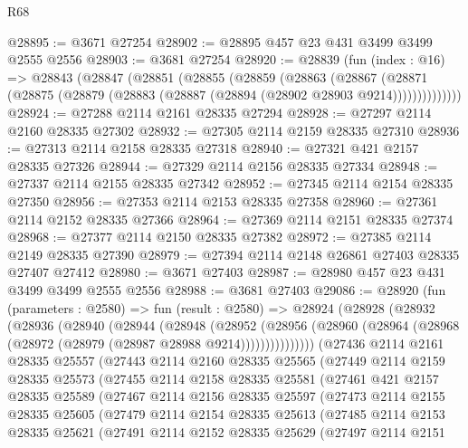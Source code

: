 \begin{lexlean}{R68}
\begin{coremodule}
@28895 := @3671 @27254
@28902 := @28895 @457 @23 @431 @3499 @3499 @2555 @2556
@28903 := @3681 @27254
@28920 := @28839
    (fun (index : @16) =>
    @28843
      (@28847
        (@28851
          (@28855
            (@28859
              (@28863
                (@28867
                  (@28871 (@28875 (@28879 (@28883 (@28887 (@28894 (@28902 @28903 @9214))))))))))))))
@28924 := @27288 @2114 @2161 @28335 @27294
@28928 := @27297 @2114 @2160 @28335 @27302
@28932 := @27305 @2114 @2159 @28335 @27310
@28936 := @27313 @2114 @2158 @28335 @27318
@28940 := @27321 @421 @2157 @28335 @27326
@28944 := @27329 @2114 @2156 @28335 @27334
@28948 := @27337 @2114 @2155 @28335 @27342
@28952 := @27345 @2114 @2154 @28335 @27350
@28956 := @27353 @2114 @2153 @28335 @27358
@28960 := @27361 @2114 @2152 @28335 @27366
@28964 := @27369 @2114 @2151 @28335 @27374
@28968 := @27377 @2114 @2150 @28335 @27382
@28972 := @27385 @2114 @2149 @28335 @27390
@28979 := @27394 @2114 @2148 @26861 @27403 @28335 @27407 @27412
@28980 := @3671 @27403
@28987 := @28980 @457 @23 @431 @3499 @3499 @2555 @2556
@28988 := @3681 @27403
@29086 := @28920
    (fun (parameters : @2580) =>
    fun (result : @2580) =>
    @28924
      (@28928
        (@28932
          (@28936
            (@28940
              (@28944
                (@28948
                  (@28952
                    (@28956
                      (@28960 (@28964 (@28968 (@28972 (@28979 (@28987 @28988 @9214)))))))))))))))
    (@27436
      @2114
      @2161
      @28335
      @25557
      (@27443
        @2114
        @2160
        @28335
        @25565
        (@27449
          @2114
          @2159
          @28335
          @25573
          (@27455
            @2114
            @2158
            @28335
            @25581
            (@27461
              @421
              @2157
              @28335
              @25589
              (@27467
                @2114
                @2156
                @28335
                @25597
                (@27473
                  @2114
                  @2155
                  @28335
                  @25605
                  (@27479
                    @2114
                    @2154
                    @28335
                    @25613
                    (@27485
                      @2114
                      @2153
                      @28335
                      @25621
                      (@27491
                        @2114
                        @2152
                        @28335
                        @25629
                        (@27497
                          @2114
                          @2151

\end{coremodule}
\end{lexlean}
